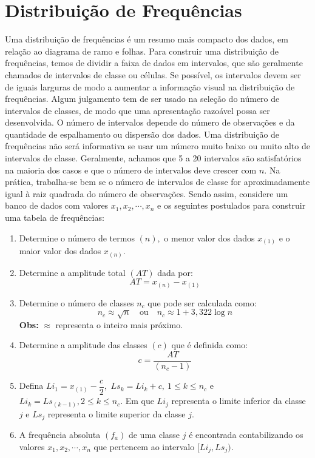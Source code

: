 \documentclass{article}
\begin{document}


\section*{Distribuição de Frequências}

Uma distribuição de frequências é um resumo mais compacto dos dados, em relação ao diagrama de ramo e folhas. Para construir uma distribuição de frequências, temos de dividir a faixa de dados em intervalos, que são geralmente chamados de intervalos de classe ou células. Se possível, os intervalos devem ser de iguais larguras de modo a aumentar a informação visual na distribuição de frequências. Algum julgamento tem de ser usado na seleção do número de intervalos de classes, de modo que uma apresentação razoável possa ser desenvolvida. O número de intervalos depende do número de observações e da quantidade de espalhamento ou dispersão dos dados. Uma distribuição de frequências não será informativa se usar um número muito baixo ou muito alto de intervalos de classe. Geralmente, achamos que 5 a 20 intervalos são satisfatórios na maioria dos casos e que o número de intervalos deve crescer com $n.$ Na prática, trabalha-se bem se o número de intervalos de classe for aproximadamente igual à raiz quadrada do número de observações. Sendo assim, considere um banco de dados com valores $x_{1},x_{2},\cdots,x_{n}$ e os seguintes postulados para construir uma tabela de frequências:

\begin{enumerate}
\item Determine o número de termos $(n),$ o menor valor dos dados $x_{(1)}$ e o maior valor dos dados $x_{(n)}.$
\item Determine a amplitude total $(AT)$ dada por: $$AT=x_{(n)}-x_{(1)}$$
\item Determine o número de classes $n_{c}$ que pode ser calculada como:
$$n_{c}\approx\sqrt{n}\quad \textrm{ou}\quad n_{c}\approx 1+3,322\log{n}$$
{\bf Obs:} $\approx$ representa o inteiro mais próximo.
\item Determine a amplitude das classes $(c)$ que é definida como:
$$c=\dfrac{AT}{(n_{c}-1)}$$
\item Defina $Li_{1}=x_{(1)}-\dfrac{c}{2},$ $Ls_{k}=Li_{k}+c,\ 1\leq k \leq n_{c}$ e
$Li_{k}=Ls_{(k-1)},2 \leq k \leq n_{c}.$ Em que $Li_{j}$ representa o limite inferior da classe $j$ e $Ls_{j}$ representa o limite superior da classe $j.$
\item A frequência absoluta $(f_{a})$ de uma classe $j$ é encontrada contabilizando os valores $x_{1},x_{2},\cdots,x_{n}$ que pertencem ao intervalo $[Li_{j},Ls_{j}).$
\end{enumerate}
\end{document}
